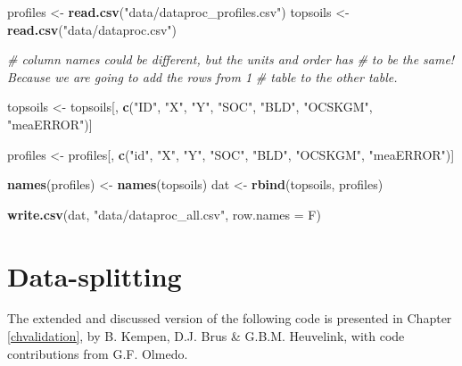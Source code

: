 \documentclass[10pt,b5paper,]{book}
\newenvironment{Shaded}{\begin{snugshade}}{\end{snugshade}}
\newcommand{\CommentTok}[1]{\textcolor[rgb]{0.56,0.35,0.01}{\textit{#1}}}
\newcommand{\DataTypeTok}[1]{\textcolor[rgb]{0.13,0.29,0.53}{#1}}
\newcommand{\KeywordTok}[1]{\textcolor[rgb]{0.13,0.29,0.53}{\textbf{#1}}}
\newcommand{\NormalTok}[1]{#1}
\newcommand{\StringTok}[1]{\textcolor[rgb]{0.31,0.60,0.02}{#1}}
\theoremstyle{definition}
\theoremstyle{definition}
\theoremstyle{definition}
\theoremstyle{remark}
\begin{document}
\begin{Shaded}
\begin{Highlighting}[]
\NormalTok{profiles <-}\StringTok{ }\KeywordTok{read.csv}\NormalTok{(}\StringTok{"data/dataproc_profiles.csv"}\NormalTok{)}
\NormalTok{topsoils <-}\StringTok{ }\KeywordTok{read.csv}\NormalTok{(}\StringTok{"data/dataproc.csv"}\NormalTok{)}


\CommentTok{# column names could be different, but the units and order has}
\CommentTok{# to be the same! Because we are going to add the rows from 1}
\CommentTok{# table to the other table.}

\NormalTok{topsoils <-}\StringTok{ }\NormalTok{topsoils[, }\KeywordTok{c}\NormalTok{(}\StringTok{"ID"}\NormalTok{, }\StringTok{"X"}\NormalTok{, }\StringTok{"Y"}\NormalTok{, }\StringTok{"SOC"}\NormalTok{, }\StringTok{"BLD"}\NormalTok{,}
                         \StringTok{"OCSKGM"}\NormalTok{, }\StringTok{"meaERROR"}\NormalTok{)]}

\NormalTok{profiles <-}\StringTok{ }\NormalTok{profiles[, }\KeywordTok{c}\NormalTok{(}\StringTok{"id"}\NormalTok{, }\StringTok{"X"}\NormalTok{, }\StringTok{"Y"}\NormalTok{, }\StringTok{"SOC"}\NormalTok{, }\StringTok{"BLD"}\NormalTok{,}
                         \StringTok{"OCSKGM"}\NormalTok{, }\StringTok{"meaERROR"}\NormalTok{)]}

\KeywordTok{names}\NormalTok{(profiles) <-}\StringTok{ }\KeywordTok{names}\NormalTok{(topsoils)}
\NormalTok{dat <-}\StringTok{ }\KeywordTok{rbind}\NormalTok{(topsoils, profiles)}

\KeywordTok{write.csv}\NormalTok{(dat, }\StringTok{"data/dataproc_all.csv"}\NormalTok{, }\DataTypeTok{row.names =}\NormalTok{ F)}
\end{Highlighting}
\end{Shaded}

\clearpage

\hypertarget{cd:data-splitting}{%
\section{Data-splitting}\label{cd:data-splitting}}

The extended and discussed version of the following code is presented in
Chapter \ref{chvalidation}, by B. Kempen, D.J. Brus \& G.B.M. Heuvelink,
with code contributions from G.F. Olmedo.
\end{document}
